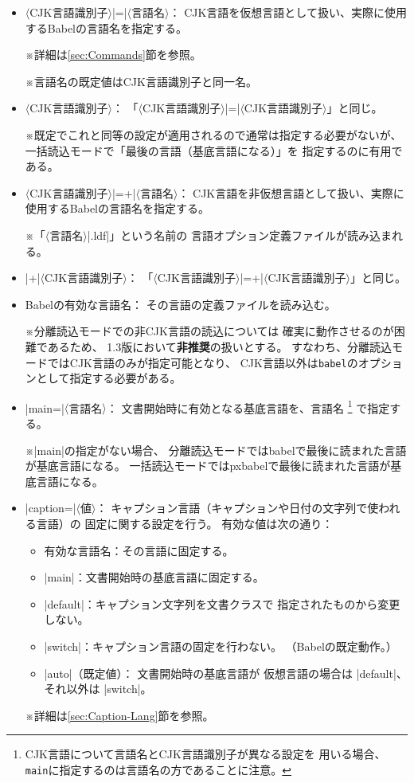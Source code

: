 \documentclass[uplatex,dvipdfmx,a4paper]{jsarticle}
\newcommand{\Pkg}[1]{\textsf{#1}}
\newcommand{\Meta}[1]{$\langle$\mbox{}#1\mbox{}$\rangle$}
\newcommand{\Note}{\par\noindent ※}
\newcommand{\Means}{：\quad\inhibitglue}
\begin{document}
\begin{itemize}
\item \Meta{CJK言語識別子}|=|\Meta{言語名}\Means
CJK言語を仮想言語として扱い、実際に使用するBabelの言語名を指定する。
\Note 詳細は\ref{sec:Commands}節を参照。
\Note 言語名の既定値はCJK言語識別子と同一名。

\item \Meta{CJK言語識別子}\Means
「\Meta{CJK言語識別子}|=|\Meta{CJK言語識別子}」と同じ。
\Note 既定でこれと同等の設定が適用されるので通常は指定する必要がないが、
一括読込モードで「最後の言語（基底言語になる）」を
指定するのに有用である。

\item \Meta{CJK言語識別子}|=+|\Meta{言語名}\Means
CJK言語を非仮想言語として扱い、実際に使用するBabelの言語名を指定する。
\Note 「\Meta{言語名}|.ldf|」という名前の
言語オプション定義ファイルが読み込まれる。

\item |+|\Meta{CJK言語識別子}\Means
「\Meta{CJK言語識別子}|=+|\Meta{CJK言語識別子}」と同じ。

\item Babelの有効な言語名\Means
その言語の定義ファイルを読み込む。
\Note 分離読込モードでの非CJK言語の読込については
確実に動作させるのが困難であるため、
1.3版において\textbf{非推奨}の扱いとする。
すなわち、分離読込モードではCJK言語のみが指定可能となり、
CJK言語以外は\texttt{babel}のオプションとして指定する必要がある。

\item |main=|\Meta{言語名}\Means
文書開始時に有効となる基底言語を、言語名
\footnote{CJK言語について言語名とCJK言語識別子が異なる設定を
用いる場合、\texttt{main}に指定するのは言語名の方であることに注意。}%
で指定する。
\Note |main|の指定がない場合、
分離読込モードでは\Pkg{babel}で最後に読まれた言語が基底言語になる。
一括読込モードでは\Pkg{pxbabel}で最後に読まれた言語が基底言語になる。

\item |caption=|\Meta{値}\Means
キャプション言語（キャプションや日付の文字列で使われる言語）の
固定に関する設定を行う。
有効な値は次の通り：
  \begin{itemize}
  \item 有効な言語名\Means その言語に固定する。
  \item |main|\Means 文書開始時の基底言語に固定する。
  \item |default|\Means キャプション文字列を文書クラスで
  指定されたものから変更しない。
  \item |switch|\Means キャプション言語の固定を行わない。
  （Babelの既定動作。）
  \item |auto|（既定値）\Means
  文書開始時の基底言語が
  仮想言語の場合は |default|、
  それ以外は |switch|。
  \end{itemize}
\Note 詳細は\ref{sec:Caption-Lang}節を参照。


\end{itemize}
\end{document}
